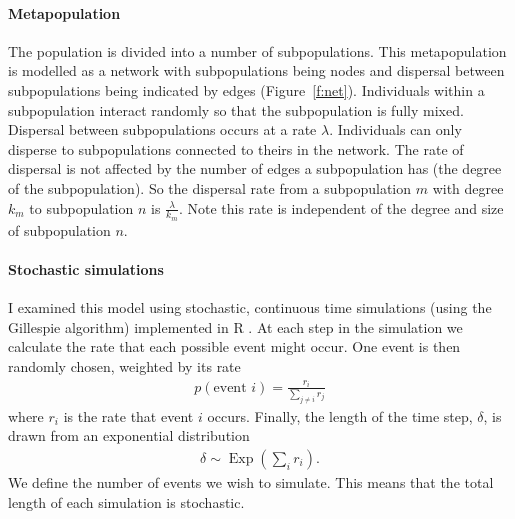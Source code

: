 \paragraph{Metapopulation}


The population is divided into a number of subpopulations.
This metapopulation is modelled as a network with subpopulations being nodes and dispersal between subpopulations being indicated by edges (Figure~\ref{f:net}).
Individuals within a subpopulation interact randomly so that the subpopulation is fully mixed.
Dispersal between subpopulations occurs at a rate $\lambda$.
Individuals can only disperse to subpopulations connected to theirs in the network.
The rate of dispersal is not affected by the number of edges a subpopulation has (the degree of the subpopulation).
So the dispersal rate from a subpopulation $m$ with degree $k_m$ to subpopulation $n$ is $\frac{\lambda}{k_m}$.
Note this rate is independent of the degree and size of subpopulation $n$.





\paragraph{Stochastic simulations}

I examined this model using stochastic, continuous time simulations (using the Gillespie algorithm) implemented in R \cite{R}.
At each step in the simulation we calculate the rate that each possible event might occur.
One event is then randomly chosen, weighted by its rate
\begin{align}
  p(\text{event } i) = \frac{r_i}{\sum_{j\neq i} r_j}
\end{align}
where $r_i$ is the rate that event $i$ occurs.
Finally, the length of the time step, $\delta$, is drawn from an exponential distribution 
\begin{align}
  \delta \sim \operatorname{Exp}\left(\sum_i r_i  \right).
\end{align}
We define the number of events we wish to simulate.
This means that the total length of each simulation is stochastic. 

